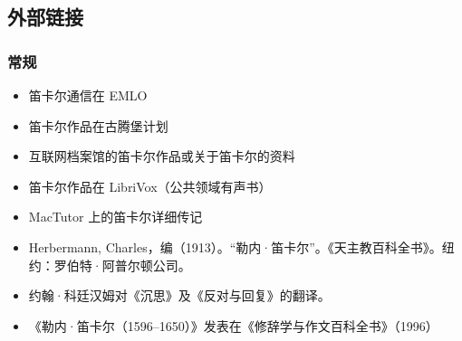 \subsection{外部链接}
\subsubsection{常规}
\begin{itemize}
\item 笛卡尔通信在 EMLO
\item 笛卡尔作品在古腾堡计划
\item 互联网档案馆的笛卡尔作品或关于笛卡尔的资料
\item 笛卡尔作品在 LibriVox（公共领域有声书）
\item MacTutor 上的笛卡尔详细传记
\item Herbermann, Charles，编（1913）。“勒内·笛卡尔”。《天主教百科全书》。纽约：罗伯特·阿普尔顿公司。
\item 约翰·科廷汉姆对《沉思》及《反对与回复》的翻译。
\item 《勒内·笛卡尔（1596–1650）》发表在《修辞学与作文百科全书》（1996）
\end{itemize}